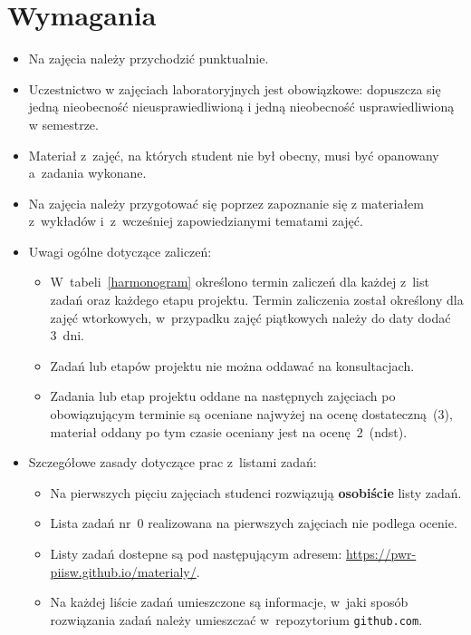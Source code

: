 \documentclass[12pt]{article}
\begin{document}
    \section*{Wymagania}
        \begin{itemize}
            \item Na zajęcia należy przychodzić punktualnie.
            \item Uczestnictwo w zajęciach laboratoryjnych jest obowiązkowe: dopuszcza się jedną nieobecność nieusprawiedliwioną i jedną nieobecność usprawiedliwioną w semestrze.
            \item Materiał z~zajęć, na których student nie był obecny, musi być opanowany a~zadania wykonane.
            \item Na zajęcia należy przygotować się poprzez zapoznanie się z materiałem z~wykładów i~z~wcześniej zapowiedzianymi tematami zajęć.
            \item Uwagi ogólne dotyczące zaliczeń:
                \begin{itemize}
                    \item W~tabeli~\ref{harmonogram} określono termin zaliczeń dla każdej z~list zadań oraz każdego etapu projektu. Termin zaliczenia został określony dla zajęć wtorkowych, w~przypadku zajęć piątkowych należy do daty dodać 3~dni.
                    \item Zadań lub etapów projektu nie można oddawać na konsultacjach.
                    \item Zadania lub etap projektu oddane na następnych zajęciach po obowiązującym terminie są oceniane najwyżej na ocenę dostateczną~(3), materiał oddany po tym czasie oceniany jest na ocenę~2~(ndst).
                \end{itemize}
            \item Szczegółowe zasady dotyczące prac z~listami zadań:
                \begin{itemize}
                    \item Na pierwszych pięciu zajęciach studenci rozwiązują \textbf{osobiście} listy zadań.
                    \item Lista zadań nr~0 realizowana na pierwszych zajęciach nie podlega ocenie.
                    \item Listy zadań dostepne są pod następującym adresem: \url{https://pwr-piisw.github.io/materialy/}.
                    \item Na każdej liście zadań umieszczone są informacje, w~jaki sposób rozwiązania zadań należy umieszczać w~repozytorium \texttt{github.com}.

\end{itemize}
\end{itemize}
\end{document}
